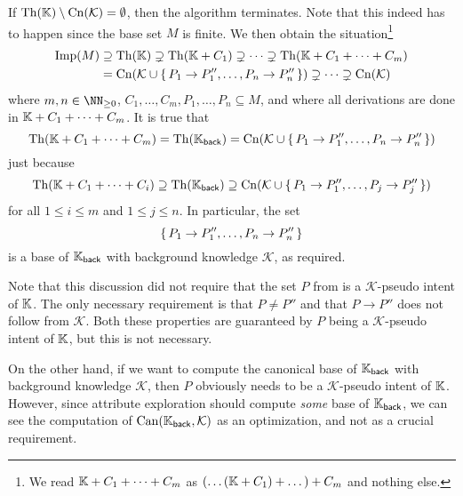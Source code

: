 If $\operatorname{Th}({\mathbb{K}}) \setminus \operatorname{Cn}(\mathcal{K}) = \emptyset$, then the algorithm terminates.
Note that this indeed has to happen since the base set $M$ is finite.  We then obtain the
situation\footnote{We read ${\mathbb{K}} + C_1 + \dots + C_m$ as $(\dots({\mathbb{K}} + C_1) + \dots )
  + C_m$ and nothing else.}
\begin{align*}
  \operatorname{Imp}(M) &\supseteq \operatorname{Th}({\mathbb{K}}) \supsetneq \operatorname{Th}({\mathbb{K}} + C_1) \supsetneq \dots \supsetneq
  \operatorname{Th}({\mathbb{K}} + C_1 + \dots + C_m) \\ &= \operatorname{Cn}(\mathcal{K} \cup {\ensuremath{\{\, P_1 \to P_1'', \dots, P_n
    \to P_n'' \,\}}}) \supsetneq \dots \supsetneq \operatorname{Cn}(\mathcal{K})
\end{align*}
where $m, n \in \NN_{\geq 0}$, $C_1, \dots, C_m, P_1, \dots, P_n \subseteq M$, and where
all derivations are done in ${\mathbb{K}} + C_1 + \dots + C_m$.  It is true that
\begin{equation*}
  \operatorname{Th}({\mathbb{K}} + C_1 + \dots + C_m) = \operatorname{Th}({\mathbb{K}}_{\mathsf{back}}) = \operatorname{Cn}(\mathcal{K} \cup
  {\ensuremath{\{\, P_1 \to P_1'', \dots, P_n \to P_n'' \,\}}})
\end{equation*}
just because
\begin{equation*}
  \operatorname{Th}({\mathbb{K}} + C_1 + \dots + C_i) \supseteq \operatorname{Th}({\mathbb{K}}_{\mathsf{back}}) \supseteq
  \operatorname{Cn}(\mathcal{K} \cup {\ensuremath{\{\, P_1 \to P_1'', \dots, P_j \to P_j''\,\}}} )
\end{equation*}
for all $1 \leq i \leq m$ and $1 \leq j \leq n$.  In particular, the set
\begin{equation*}
  {\ensuremath{\{\,P_1 \to P_1'', \dots, P_n \to P_n''\,\}}}
\end{equation*}
is a base of ${\mathbb{K}}_{\mathsf{back}}$ with background knowledge $\mathcal{K}$, as
required.

Note that this discussion did not require that the set $P$ from  is a
$\mathcal{K}$-pseudo intent of ${\mathbb{K}}$.  The only necessary requirement is that $P \neq
P''$ and that $P \to P''$ does not follow from $\mathcal{K}$.  Both these properties are
guaranteed by $P$ being a $\mathcal{K}$-pseudo intent of ${\mathbb{K}}$, but this is not
necessary.

On the other hand, if we want to compute the canonical base of ${\mathbb{K}}_{\mathsf{back}}$
with background knowledge $\mathcal{K}$, then $P$ obviously needs to be a
$\mathcal{K}$-pseudo intent of ${\mathbb{K}}$.  However, since attribute exploration should
compute \emph{some} base of ${\mathbb{K}}_{\mathsf{back}}$, we can see the computation of
$\operatorname{Can}({\mathbb{K}}_{\mathsf{back}}, \mathcal{K})$ as an optimization, and not as a crucial
requirement.

